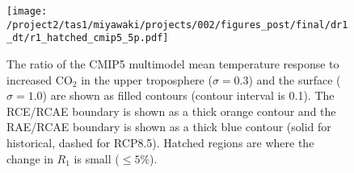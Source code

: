 \documentclass{ametsocV5}
\begin{document}


\begin{figure}
  \centering
  \noindent\texttt{[image: /project2/tas1/miyawaki/projects/002/figures\_post/final/dr1\_dt/r1\_hatched\_cmip5\_5p.pdf]}\\
  \caption{The ratio of the CMIP5 multimodel mean temperature response to increased CO$_2$ in the upper troposphere ($\sigma=0.3$) and the surface ($\sigma=1.0$) are shown as filled contours (contour interval is 0.1). The RCE/RCAE boundary is shown as a thick orange contour and the RAE/RCAE boundary is shown as a thick blue contour (solid for historical, dashed for RCP8.5). Hatched regions are where the change in $R_1$ is small ($\le5\%$).}
  \label{fig:cmip5-dtemp}
\end{figure}
\end{document}
